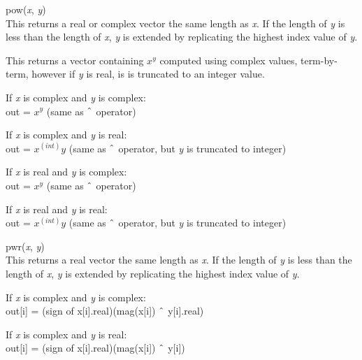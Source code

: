 \begin{description}
\item{\vt pow}({\it x\/}, {\it y\/})\\
This returns a real or complex vector the same length as {\it x\/}. 
If the length of {\it y} is less than the length of {\it x\/}, {\it y}
is extended by replicating the highest index value of {\it y\/}.

This returns a vector containing $x^y$ computed using complex values,
term-by-term, however if {\it y} is real, is is truncated to an
integer value.

\begin{description}
\item{If {\it x} is complex and {\it y} is complex:}\\
  {\vt out =} $x^y$ (same as $\symbol{94}$ operator)

\item{If {\it x} is complex and {\it y} is real:}\\
  {\vt out =} $x^(int)y$ (same as $\symbol{94}$ operator, but {\it y}
    is truncated to integer)

\item{If {\it x} is real and {\it y} is complex:}\\
  {\vt out =} $x^y$ (same as $\symbol{94}$ operator)

\item{If {\it x} is real and {\it y} is real:}\\
  {\vt out =} $x^(int)y$ (same as $\symbol{94}$ operator, but {\it y}
    is truncated to integer)
\end{description}

\item{\vt pwr}({\it x\/}, {\it y\/})\\
This returns a real vector the same length as {\it x\/}.  If the
length of {\it y} is less than the length of {\it x\/}, {\it y} is
extended by replicating the highest index value of {\it y\/}.

\begin{description}
\item{If {\it x} is complex and {\it y} is complex:}\\
  {\vt out[i] =} (sign of {\vt x[i].real})({\vt mag(x[i])} $\symbol{94}$
  {\vt y[i].real})

\item{If {\it x} is complex and {\it y} is real:}\\
  {\vt out[i] =} (sign of {\vt x[i].real})({\vt mag(x[i])} $\symbol{94}$
  {\vt y[i]})


\end{description}
\end{description}
